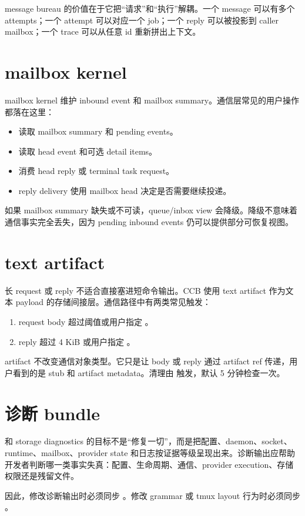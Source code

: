 message bureau 的价值在于它把“请求”和“执行”解耦。一个 message 可以有多个 attempts；一个 attempt 可以对应一个 job；一个 reply 可以被投影到 caller mailbox；一个 trace 可以从任意 id 重新拼出上下文。

\section{mailbox kernel}

mailbox kernel 维护 inbound event 和 mailbox summary。通信层常见的用户操作都落在这里：

\begin{itemize}
  \item {} 读取 mailbox summary 和 pending events。
  \item {} 读取 head event 和可选 detail items。
  \item {} 消费 head reply 或 terminal task request。
  \item reply delivery 使用 mailbox head 决定是否需要继续投递。
\end{itemize}

如果 mailbox summary 缺失或不可读，queue/inbox view 会降级。降级不意味着通信事实完全丢失，因为 pending inbound events 仍可以提供部分可恢复视图。

\section{text artifact}

长 request 或 reply 不适合直接塞进短命令输出。CCB 使用 text artifact 作为文本 payload 的存储间接层。通信路径中有两类常见触发：

\begin{enumerate}
  \item request body 超过阈值或用户指定 。
  \item reply 超过 4 KiB 或用户指定 。
\end{enumerate}

artifact 不改变通信对象类型。它只是让 body 或 reply 通过 artifact ref 传递，用户看到的是 stub 和 artifact metadata。清理由  触发，默认 5 分钟检查一次。

\section{诊断 bundle}

 和 storage diagnostics 的目标不是“修复一切”，而是把配置、daemon、socket、runtime、mailbox、provider state 和日志按证据等级呈现出来。诊断输出应帮助开发者判断哪一类事实失真：配置、生命周期、通信、provider execution、存储权限还是残留文件。

因此，修改诊断输出时必须同步 。修改  grammar 或 tmux layout 行为时必须同步 。

